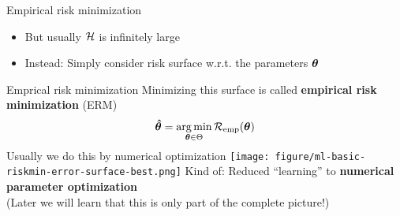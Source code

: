 \documentclass[11pt,compress,t,notes=noshow, xcolor=table]{beamer}
\begin{document}
\begin{frame}{Empirical risk minimization}
\begin{itemize}
  \item But usually $\mathcal{H}$ is infinitely large
  \item Instead: Simply consider risk surface w.r.t. the parameters $\bm{\theta}$ 
\end{itemize}
{
}
\end{frame}


\begin{frame}{Emprical risk minimization}
Minimizing this surface is called \textbf{empirical risk minimization} (ERM)
$$
\bm{\hat\theta} = \mathop{\mathrm{arg\,min}}_{\bm{\theta} \in \Theta} \mathcal{R}_{\text{emp}}(\bm{\theta})
$$
Usually we do this by numerical optimization
{
\vfill
\texttt{[image: figure/ml-basic-riskmin-error-surface-best.png]}
}
\vfill
Kind of: Reduced ``learning'' to \textbf{numerical parameter optimization}\\
(Later we will learn that this is only part of the complete picture!)
\end{frame}

\endlecture
\end{document}

